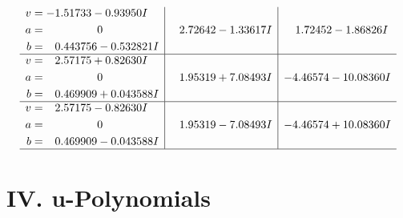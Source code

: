 \documentclass[1p]{elsarticle_modified}
\theoremstyle{definition}
\begin{document}
$$\begin{array}{c|c|c}
\begin{aligned}
v &= -1.51733 - 0.93950 I \\
a &= \phantom{-0.000000 } 0 \\
b &= \phantom{-}0.443756 - 0.532821 I\end{aligned}
 & \phantom{-}2.72642 - 1.33617 I & \phantom{-}1.72452 - 1.86826 I \\ \hline\begin{aligned}
v &= \phantom{-}2.57175 + 0.82630 I \\
a &= \phantom{-0.000000 } 0 \\
b &= \phantom{-}0.469909 + 0.043588 I\end{aligned}
 & \phantom{-}1.95319 + 7.08493 I & -4.46574 - 10.08360 I \\ \hline\begin{aligned}
v &= \phantom{-}2.57175 - 0.82630 I \\
a &= \phantom{-0.000000 } 0 \\
b &= \phantom{-}0.469909 - 0.043588 I\end{aligned}
 & \phantom{-}1.95319 - 7.08493 I & -4.46574 + 10.08360 I\\
 \hline 
 \end{array}$$\newpage
\newpage\renewcommand{\arraystretch}{1}
\centering \section*{ IV. u-Polynomials}
\end{document}
